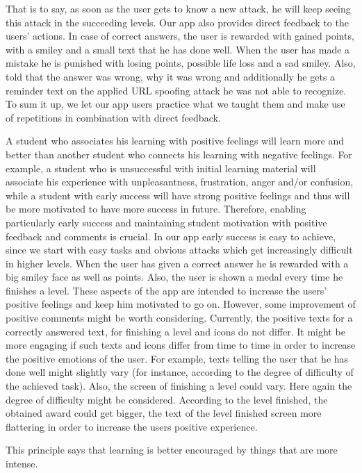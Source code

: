 \begin{description}[leftmargin=0cm]
That is to say, as soon as the user gets to know a new attack, he will keep seeing this attack in the succeeding levels.
Our app also provides direct feedback to the users' actions. 
In case of correct answers, the user is rewarded with gained points, with a smiley and a small text that he has done well.
When the user has made a mistake he is punished with losing points, possible life loss and a sad smiley. Also, told that the answer was wrong, why it was wrong and additionally he gets a reminder text on the applied URL spoofing attack he was not able to recognize.
To sum it up, we let our app users practice what we taught them and make use of repetitions in combination with direct feedback.
	\item[Effect] A student who associates his learning with positive feelings will learn more and better than another student who connects his learning with negative feelings. 
For example, a student who is unsuccessful with initial learning material will associate his experience with unpleasantness, frustration, anger and/or confusion, while a student with early success will have strong positive feelings and thus will be more motivated to have more success in future.
Therefore, enabling particularly early success and maintaining student motivation with positive feedback and comments is crucial.
In our app early success is easy to achieve, since we start with easy tasks and obvious attacks which get increasingly difficult in higher levels.
When the user has given a correct answer he is rewarded with a big smiley face as well as points. 
Also, the user is shown a medal every time he finishes a level.
These aspects of the app are intended to increase the users' positive feelings and keep him motivated to go on. 
However, some improvement of positive comments might be worth considering.
Currently, the positive texts for a correctly answered text, for finishing a level and icons do not differ. 
It might be more engaging if such texts and icons differ from time to time in order to increase the positive emotions of the user. 
For example, texts telling the user that he has done well might slightly vary (for instance, according to the degree of difficulty of the achieved task).
Also, the screen of finishing a level could vary.
Here again the degree of difficulty might be considered. 
According to the level finished, the obtained award could get bigger, the text of the level finished screen more flattering in order to increase the users positive experience.
	\item[Intensity] This principle says that learning is better encouraged by things that are more intense. 

\end{description}
